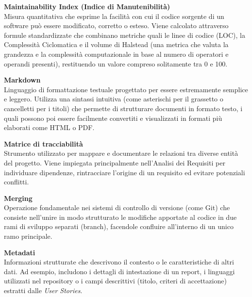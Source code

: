 \documentclass[12pt, a4paper]{article}
\begin{document}
\noindent\hypertarget{maintainability-index}{\textbf{Maintainability Index (Indice di Manutenibilità)}} \\[0.1em]
Misura quantitativa che esprime la facilità con cui il codice sorgente di un software può essere modificato, corretto o esteso. Viene calcolato attraverso formule standardizzate che combinano metriche quali le linee di codice (LOC), la Complessità Ciclomatica e il volume di Halstead (una metrica che valuta la grandezza e la complessità computazionale in base al numero di operatori e operandi presenti), restituendo un valore compreso solitamente tra 0 e 100.
\vspace{0.5cm}

\noindent\hypertarget{markdown}{\textbf{Markdown}} \\[0.1em]
Linguaggio di formattazione testuale progettato per essere estremamente semplice e leggero. Utilizza una sintassi intuitiva (come asterischi per il grassetto o cancelletti per i titoli) che permette di strutturare documenti in formato testo, i quali possono poi essere facilmente convertiti e visualizzati in formati più elaborati come HTML o PDF.
\vspace{0.5cm}

\noindent\hypertarget{matrice-di-tracciabilita}{\textbf{Matrice di tracciabilità}} \\[0.1em]
Strumento utilizzato per mappare e documentare le relazioni tra diverse entità del progetto. Viene impiegata principalmente nell'Analisi dei Requisiti per individuare dipendenze, rintracciare l'origine di un requisito ed evitare potenziali conflitti.
\vspace{0.5cm}

\noindent\hypertarget{merging}{\textbf{Merging}} \\[0.1em]
Operazione fondamentale nei sistemi di controllo di versione (come Git) che consiste nell'unire in modo strutturato le modifiche apportate al codice in due rami di sviluppo separati (branch), facendole confluire all'interno di un unico ramo principale.
\vspace{0.5cm}

\noindent\hypertarget{metadati}{\textbf{Metadati}} \\[0.1em]
Informazioni strutturate che descrivono il contesto o le caratteristiche di altri dati. Ad esempio, includono i dettagli di intestazione di un report, i linguaggi utilizzati nel repository o i campi descrittivi (titolo, criteri di accettazione) estratti dalle \textit{User Stories}.
\vspace{0.5cm}  
\end{document}
